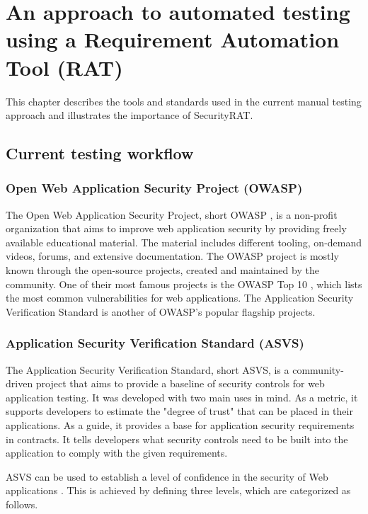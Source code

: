 \addchapheadtotoc
\chapter{An approach to automated testing using a Requirement Automation Tool (RAT)}

This chapter describes the tools and standards used in the current manual testing approach and illustrates the importance of SecurityRAT.

\section{Current testing workflow}
\label{current_testing_etas}

\subsection{Open Web Application Security Project (OWASP)}
The Open Web Application Security Project, short OWASP \citep{owasp2020}, is a non-profit organization that aims to improve web application security by providing freely available educational material. The material includes different tooling, on-demand videos, forums, and extensive documentation. 
The OWASP project is mostly known through the open-source projects, created and maintained by the community.
One of their most famous projects is the OWASP Top 10 \citep{owaspTopTen2020}, which lists the most common vulnerabilities for web applications. The Application Security Verification Standard \citep{owaspAsvs2020} is another of OWASP's popular flagship projects. 


\subsection{Application Security Verification Standard (ASVS)}
\label{asvsStandard}
The Application Security Verification Standard, short ASVS, is a community-driven project that aims to provide a baseline of security controls for web application testing.
It was developed with two main uses in mind. 
As a metric, it supports developers to estimate the "degree of trust" \citep{asvs4.0} that can be placed in their applications.
As a guide, it provides a base for application security requirements in contracts. It tells developers what security controls need to be built into the application to comply with the given requirements.

ASVS can be used to establish a level of confidence in the security of Web applications \citep{asvs4.0}. This is achieved by defining three levels, which are categorized as follows.

